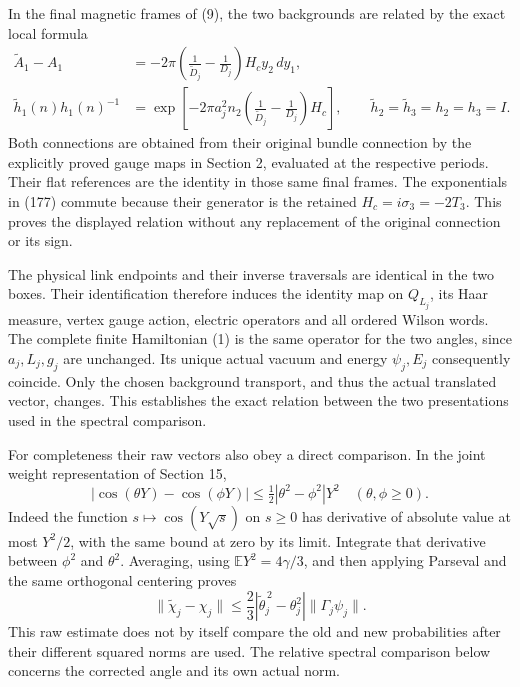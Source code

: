 \documentclass[
  11pt,
]{article}
\begin{document}
In the final magnetic frames of (9), the two backgrounds are related by
the exact local formula \[
 \begin{split}
 \widetilde A_1-A_1
 &=-2\pi\left(\frac1{\widetilde D_j}-\frac1{D_j}\right)
                       H_cy_2\,dy_1,\\
 \widetilde h_1(n)h_1(n)^{-1}
 &=\exp\left[-2\pi a_j^2 n_2
       \left(\frac1{\widetilde D_j}-\frac1{D_j}\right)H_c\right],
 \qquad \widetilde h_2=\widetilde h_3=h_2=h_3=I.
 \end{split}
 \tag{177}
\] Both connections are obtained from their original bundle connection
by the explicitly proved gauge maps in Section 2, evaluated at the
respective periods. Their flat references are the identity in those same
final frames. The exponentials in (177) commute because their generator
is the retained \(H_c=i\sigma_3=-2T_3\). This proves the displayed
relation without any replacement of the original connection or its sign.

The physical link endpoints and their inverse traversals are identical
in the two boxes. Their identification therefore induces the identity
map on \(Q_{L_j}\), its Haar measure, vertex gauge action, electric
operators and all ordered Wilson words. The complete finite Hamiltonian
(1) is the same operator for the two angles, since \(a_j,L_j,g_j\) are
unchanged. Its unique actual vacuum and energy \(\psi_j,E_j\)
consequently coincide. Only the chosen background transport, and thus
the actual translated vector, changes. This establishes the exact
relation between the two presentations used in the spectral comparison.

For completeness their raw vectors also obey a direct comparison. In the
joint weight representation of Section 15, \[
 |\cos(\theta Y)-\cos(\phi Y)|
 \le\tfrac12|\theta^2-\phi^2|Y^2
 \quad(\theta,\phi\ge0).
\] Indeed the function \(s\mapsto\cos(Y\sqrt s)\) on \(s\ge0\) has
derivative of absolute value at most \(Y^2/2\), with the same bound at
zero by its limit. Integrate that derivative between \(\phi^2\) and
\(\theta^2\). Averaging, using \(\mathbb E Y^2=4\gamma/3\), and then
applying Parseval and the same orthogonal centering proves \[
 \|\widetilde\chi_j-\chi_j\|
 \le\frac23|\widetilde\theta_j^{\,2}-\theta_j^2|
                                      \|\Gamma_j\psi_j\|.
 \tag{178}
\] This raw estimate does not by itself compare the old and new
probabilities after their different squared norms are used. The relative
spectral comparison below concerns the corrected angle and its own
actual norm.
\end{document}
